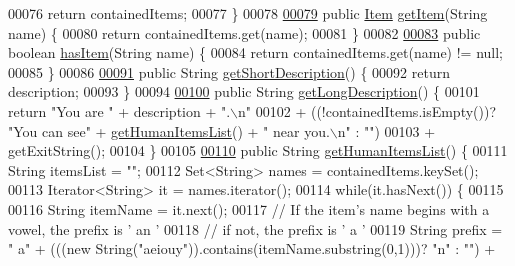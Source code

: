 \begin{DoxyCode}
00076         \textcolor{keywordflow}{return} containedItems;
00077     \}
00078 
\hypertarget{Room_8java_source_l00079}{}\hyperlink{classRoom_a9b53c8d9f87f4a6d9cc954aeb744d1a2}{00079}     \textcolor{keyword}{public} \hyperlink{classItem}{Item} \hyperlink{classRoom_a9b53c8d9f87f4a6d9cc954aeb744d1a2}{getItem}(String name) \{
00080         \textcolor{keywordflow}{return} containedItems.get(name);
00081     \}
00082 
\hypertarget{Room_8java_source_l00083}{}\hyperlink{classRoom_ad779b367b26018c9f343ca3044c4b54f}{00083}     \textcolor{keyword}{public} \textcolor{keywordtype}{boolean} \hyperlink{classRoom_ad779b367b26018c9f343ca3044c4b54f}{hasItem}(String name) \{
00084         \textcolor{keywordflow}{return} containedItems.get(name) != null;
00085     \}
00086 
\hypertarget{Room_8java_source_l00091}{}\hyperlink{classRoom_a85e561bc5fa9d9c965300e9ad264b02a}{00091}     \textcolor{keyword}{public} String \hyperlink{classRoom_a85e561bc5fa9d9c965300e9ad264b02a}{getShortDescription}() \{
00092         \textcolor{keywordflow}{return} description;
00093     \}
00094 
\hypertarget{Room_8java_source_l00100}{}\hyperlink{classRoom_a23a25854d7544fb0b41190a4d6bd1322}{00100}     \textcolor{keyword}{public} String \hyperlink{classRoom_a23a25854d7544fb0b41190a4d6bd1322}{getLongDescription}() \{
00101         \textcolor{keywordflow}{return} \textcolor{stringliteral}{"You are "} + description + \textcolor{stringliteral}{".\(\backslash\)n"}
00102                 + ((!containedItems.isEmpty())? \textcolor{stringliteral}{"You can see"} + 
      \hyperlink{classRoom_ab8a87ad306f77a936873094b479bcde8}{getHumanItemsList}() + \textcolor{stringliteral}{" near you.\(\backslash\)n"} : \textcolor{stringliteral}{""})
00103                 + getExitString();
00104     \}
00105 
\hypertarget{Room_8java_source_l00110}{}\hyperlink{classRoom_ab8a87ad306f77a936873094b479bcde8}{00110}     \textcolor{keyword}{public} String \hyperlink{classRoom_ab8a87ad306f77a936873094b479bcde8}{getHumanItemsList}() \{
00111         String itemsList = \textcolor{stringliteral}{""};
00112         Set<String> names = containedItems.keySet();
00113         Iterator<String> it = names.iterator();
00114         \textcolor{keywordflow}{while}(it.hasNext()) \{
00115 
00116             String itemName = it.next();
00117             \textcolor{comment}{// If the item's name begins with a vowel, the prefix is ' an '}
00118             \textcolor{comment}{// if not, the prefix is ' a '}
00119             String prefix = \textcolor{stringliteral}{" a"} + (((\textcolor{keyword}{new} String(\textcolor{stringliteral}{"aeiouy"})).contains(itemName.substring(0,1)))? \textcolor{stringliteral}{"n"} : \textcolor{stringliteral}{""}) +

\end{DoxyCode}
